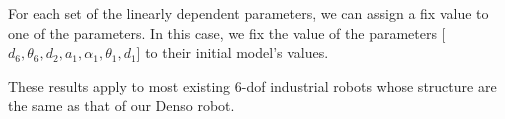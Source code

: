 For each set of the linearly dependent parameters, we can assign a fix value to one of the parameters. In this case, we fix the value of the parameters [$d_6, \theta_6, d_2, a_1, \alpha_1, \theta_1, d_1$] to their initial model's values. 

These results apply to most existing 6-\ac{dof} industrial robots whose structure are the same as that of our Denso robot. 


